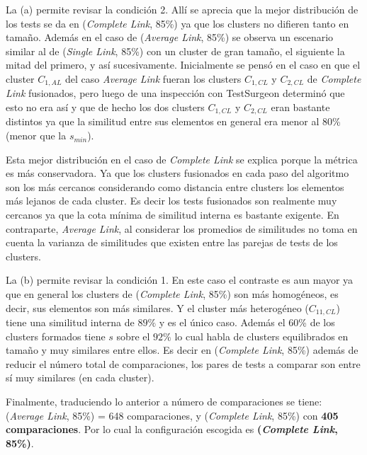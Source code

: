 \par La (a) permite revisar la condición 2. Allí se aprecia que la mejor distribución de los tests se da en (\emph{Complete Link}, 85\%) ya que los clusters no difieren tanto en tamaño. Además en el caso de (\emph{Average Link}, 85\%) se observa un escenario similar al de (\emph{Single Link}, 85\%) con un cluster de gran tamaño, el siguiente la mitad del primero, y así sucesivamente. Inicialmente se pensó en el caso en que el cluster $C_{1,AL}$ del caso \emph{Average Link} fueran los clusters $C_{1,CL}$ y $C_{2,CL}$ de \emph{Complete Link} fusionados, pero luego de una inspección con TestSurgeon determinó que esto no era así y que de hecho los dos clusters $C_{1,CL}$ y $C_{2,CL}$ eran bastante distintos ya que la similitud entre sus elementos en general era menor al 80\% (menor que la $s_{min}$). 

\par Esta mejor distribución en el caso de \emph{Complete Link} se explica porque la métrica es más conservadora. Ya que los clusters fusionados en cada paso del algoritmo son los más cercanos considerando como distancia entre clusters los elementos más lejanos de cada cluster. Es decir los tests fusionados son realmente muy cercanos ya que la cota mínima de similitud interna es bastante exigente. En contraparte, \emph{Average Link}, al considerar los promedios de similitudes no toma en cuenta la varianza de similitudes que existen entre las parejas de tests de los clusters.

\par La (b) permite revisar la condición 1. En este caso el contraste es aun mayor ya que en general los clusters de (\emph{Complete Link}, 85\%) son más homogéneos, es decir, sus elementos son más similares. Y el cluster más heterogéneo ($C_{11,CL}$) tiene una similitud interna de $89\%$ y es el único caso. Además el 60\% de los clusters formados tiene $s$ sobre el $92\%$ lo cual habla de clusters equilibrados en tamaño y muy similares entre ellos. Es decir en (\emph{Complete Link}, 85\%) además de reducir el número total de comparaciones, los pares de tests a comparar son entre sí muy similares (en cada cluster).

\par Finalmente, traduciendo lo anterior a número de comparaciones se tiene: (\emph{Average Link}, 85\%) = 648 comparaciones, y (\emph{Complete Link}, 85\%) con \textbf{405 comparaciones}. Por lo cual la configuración escogida es {\bf (\emph{Complete Link}, 85\%)}.

